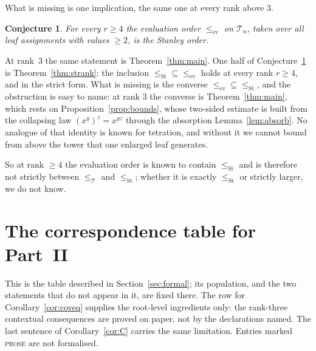 \documentclass[11pt,a4paper]{article}
\theoremstyle{plain}
\newtheorem{conjecture}[theorem]{Conjecture}
\theoremstyle{definition}
\newcommand{\ev}{\mathrm{ev}}
\newcommand{\Tam}{\mathcal{T}}
\newcommand{\St}{\mathrm{St}}
\begin{document}
What is missing is one implication, the same one at every rank above $3$.

\begin{conjecture}\label{conj:higher}
For every $r\ge4$ the evaluation order $\le_{\ev}$ on $\Tam_n$, taken over all leaf
assignments with values $\ge2$, is the Stanley order.
\end{conjecture}

At rank~$3$ the same statement is Theorem~\ref{thm:main}.
One half of Conjecture~\ref{conj:higher} is Theorem~\ref{thm:strank}: the inclusion
$\le_{\St}\subseteq\le_{\ev}$ holds at every rank $r\ge4$, and in the strict form.
What is missing is the converse $\le_{\ev}\subseteq\le_{\St}$, and the obstruction is
easy to name: at rank $3$ the converse is Theorem~\ref{thm:main}, which rests on
Proposition~\ref{prop:bounds}, whose two-sided estimate is built from the collapsing law
$(x^{y})^{z}=x^{yz}$ through the absorption Lemma~\ref{lem:absorb}. No analogue of that
identity is known for tetration, and without it we cannot bound from above the tower
that one enlarged leaf generates.

So at rank $\ge4$ the evaluation order is known to contain $\le_{\St}$ and is therefore
not strictly between $\le_{\Tam}$ and $\le_{\St}$; whether it is exactly $\le_{\St}$ or
strictly larger, we do not know.

\appendix

\section{The correspondence table for Part~II}\label{app:table}

This is the table described in Section~\ref{sec:formal}; its population, and the two
statements that do not appear in it, are fixed there. The row for
Corollary~\ref{cor:coveq} supplies the root-level ingredients only: the rank-three
contextual consequences are proved on paper, not by the declarations named. The last
sentence of Corollary~\ref{cor:C} carries the same limitation. Entries marked
\textsc{prose} are not formalised.
\end{document}
